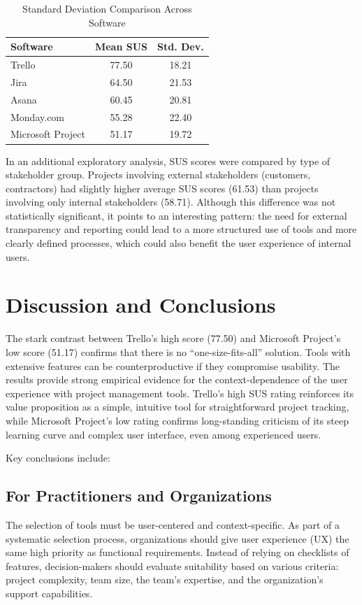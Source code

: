 \documentclass[runningheads]{llncs}
\begin{document}
\begin{table}[h]
\caption{Standard Deviation Comparison Across Software}
\centering
\begin{tabular}{l c c}
\toprule
\textbf{Software} & \textbf{Mean SUS} & \textbf{Std. Dev.} \\
\midrule
Trello & 77.50 & 18.21 \\
Jira & 64.50 & 21.53 \\
Asana & 60.45 & 20.81 \\
Monday.com & 55.28 & 22.40 \\
Microsoft Project & 51.17 & 19.72 \\
\bottomrule
\end{tabular}
\end{table}

In an additional exploratory analysis, SUS scores were compared by type of stakeholder group. Projects involving external stakeholders (customers, contractors) had slightly higher average SUS scores (61.53) than projects involving only internal stakeholders (58.71). Although this difference was not statistically significant, it points to an interesting pattern: the need for external transparency and reporting could lead to a more structured use of tools and more clearly defined processes, which could also benefit the user experience of internal users.



\section{Discussion and Conclusions}
The stark contrast between Trello’s high score (77.50) and Microsoft Project’s low score (51.17) confirms that there is no “one-size-fits-all” solution. Tools with extensive features can be counterproductive if they compromise usability. The results provide strong empirical evidence for the context-dependence of the user experience with project management tools. Trello’s high SUS rating reinforces its value proposition as a simple, intuitive tool for straightforward project tracking, while Microsoft Project’s low rating confirms long-standing criticism of its steep learning curve and complex user interface, even among experienced users.


Key conclusions include:

\subsection{For Practitioners and Organizations}
The selection of tools must be user-centered and context-specific. As part of a systematic selection process, organizations should give user experience (UX) the same high priority as functional requirements. Instead of relying on checklists of features, decision-makers should evaluate suitability based on various criteria: project complexity, team size, the team’s expertise, and the organization’s support capabilities.
\end{document}
